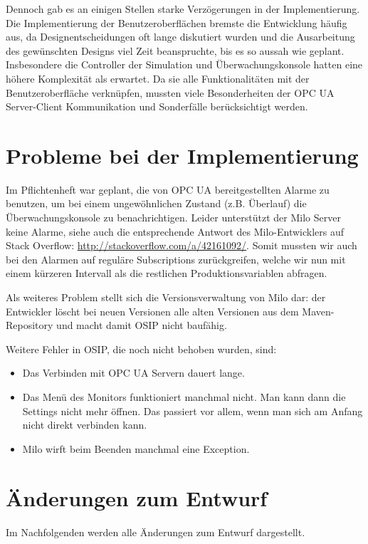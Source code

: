 \documentclass[parskip=full]{scrartcl}
\begin{document}
Dennoch gab es an einigen Stellen starke Verzögerungen in der Implementierung.
Die Implementierung der Benutzeroberflächen bremste die Entwicklung häufig aus, da Designentscheidungen oft lange
diskutiert wurden und die Ausarbeitung des gewünschten Designs viel Zeit beanspruchte, bis es so aussah wie geplant.
Insbesondere die Controller der Simulation und Überwachungskonsole hatten eine höhere Komplexität als erwartet.
Da sie alle Funktionalitäten mit der Benutzeroberfläche verknüpfen, mussten viele Besonderheiten der OPC UA Server-Client Kommunikation und Sonderfälle berücksichtigt werden.

\section{Probleme bei der Implementierung}
Im Pflichtenheft war geplant, die von OPC UA bereitgestellten Alarme zu benutzen, um bei einem ungewöhnlichen Zustand (z.B. Überlauf)
die Überwachungskonsole zu benachrichtigen. Leider unterstützt der Milo Server keine Alarme, siehe auch die entsprechende Antwort
des Milo-Entwicklers auf Stack Overflow: \href{http://stackoverflow.com/a/42161092/}{http://stackoverflow.com/a/42161092/}.
Somit mussten wir auch bei den Alarmen auf reguläre Subscriptions zurückgreifen, welche wir nun mit einem kürzeren Intervall
als die restlichen Produktionsvariablen abfragen.

Als weiteres Problem stellt sich die Versionsverwaltung von Milo dar: der Entwickler löscht bei neuen Versionen alle alten Versionen aus dem Maven-Repository und macht damit OSIP nicht baufähig.

Weitere Fehler in OSIP, die noch nicht behoben wurden, sind:
\begin{itemize}
 \item Das Verbinden mit OPC UA Servern dauert lange.
 \item Das Menü des Monitors funktioniert manchmal nicht. Man kann dann die Settings nicht mehr öffnen. Das passiert vor allem, wenn man sich am Anfang nicht direkt verbinden kann.
 \item Milo wirft beim Beenden manchmal eine Exception.
\end{itemize}

\section{Änderungen zum Entwurf}
Im Nachfolgenden werden alle Änderungen zum Entwurf dargestellt.
\end{document}
